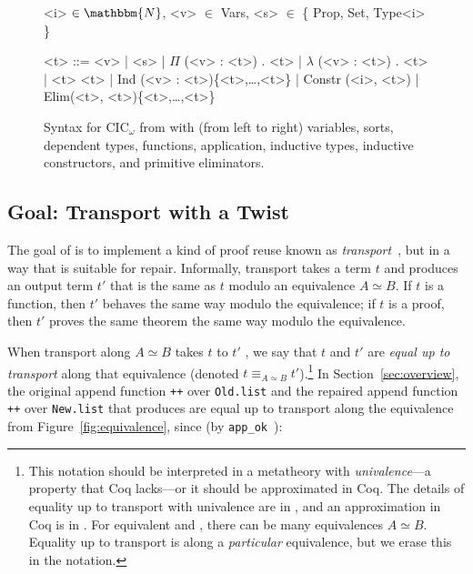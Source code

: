 \begin{figure*}
\small
\begin{grammar}
<i> $\in \mathbbm{N}$, <v> $\in$ Vars, <s> $\in$ \{ Prop, Set, Type<i> \}

<t> ::= <v> | <s> | $\Pi$ (<v> : <t>) . <t> | $\lambda$ (<v> : <t>) . <t> | <t> <t> | Ind (<v> : <t>)\{<t>,\ldots,<t>\} | Constr (<i>, <t>) | Elim(<t>, <t>)\{<t>,\ldots,<t>\}
\end{grammar}
\vspace{-0.3cm}
\caption{Syntax for CIC$_\omega$ from \citet{Timany2015FirstST} with (from left to right) variables, sorts, dependent types, functions, application, inductive types, inductive constructors, and primitive eliminators.}
\label{fig:syntax}
\end{figure*}

\subsection{Goal: Transport with a Twist}
\label{sec:repair}

The goal of \toolname is to implement a kind of proof reuse known as \textit{transport}~\cite{univalent2013homotopy},
but in a way that is suitable for repair.
Informally, transport takes a term $t$ and produces an output term $t'$ that is the same as $t$ modulo an equivalence $A \simeq B$.
If $t$ is a function, then $t'$ behaves the same way modulo the equivalence;
if $t$ is a proof, then $t'$ proves the same theorem the same way modulo the equivalence.

When transport along $A \simeq B$ takes $t$ to $t'$ ,
we say that $t$ and $t'$ are \textit{equal up to transport}
along that equivalence (denoted $t \equiv_{A \simeq B} t'$).\footnote{This notation should be interpreted in a metatheory with \textit{univalence}---a property that Coq lacks---or it should be approximated in Coq.
The details of equality up to transport with univalence are in \citet{univalent2013homotopy}, and an approximation in Coq is in \citet{tabareau2017equivalences}. For equivalent \A and \B, there can be many equivalences $A \simeq B$.
Equality up to transport is along a \textit{particular} equivalence, but we erase this in the 
notation.}
In Section~\ref{sec:overview}, the original append function \lstinline{++} over \lstinline{Old.list}
and the repaired append function \lstinline{++} over \lstinline{New.list} that \toolname produces are
equal up to transport along the equivalence from Figure~\ref{fig:equivalence}, since (by \lstinline{app_ok}~):

